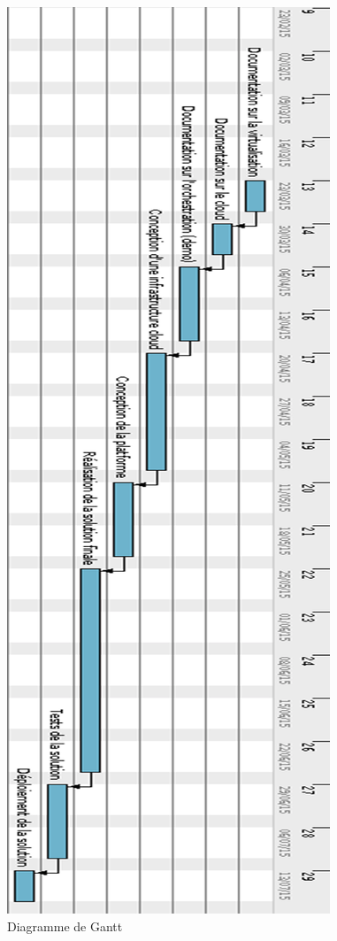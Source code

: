 \begin{onehalfspace}
\begin{figure}[H]
\centering
\includegraphics [scale=0.5]{chapitre1/assets/gantt.png}
\caption{Diagramme de Gantt}
\end{figure}


\end{onehalfspace}
